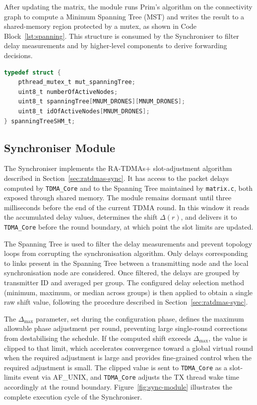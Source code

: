 After updating the matrix, the module runs Prim's algorithm on the connectivity graph to compute
a Minimum Spanning Tree (MST) and writes the result to a shared-memory region protected by
a mutex, as shown in Code Block~\ref{lst:spanning}. This structure is consumed by the Synchroniser
to filter delay measurements and by higher-level components to derive forwarding decisions.

\medskip
\noindent\begin{minipage}{\linewidth}
\begin{lstlisting}[language=C,
    caption={Variables stored in the shared memory for the Spanning Tree~\cite{almeida2023synchronization}},
    label={lst:spanning}]
typedef struct {
    pthread_mutex_t mut_spanningTree;
    uint8_t numberOfActiveNodes;
    uint8_t spanningTree[MNUM_DRONES][MNUM_DRONES];
    uint8_t idOfActiveNodes[MNUM_DRONES];
} spanningTreeSHM_t;
\end{lstlisting}
\end{minipage}

\subsection{Synchroniser Module}

The Synchroniser implements the RA-TDMAs+ slot-adjustment algorithm described in
Section~\ref{sec:ratdmas-sync}. It has access to the packet delays computed by
\texttt{TDMA\_Core} and to the Spanning Tree maintained by \texttt{matrix.c}, both exposed
through shared memory. The module remains dormant until three milliseconds before the end of
the current TDMA round. In this window it reads the accumulated delay values, determines the
shift $\Delta(r)$, and delivers it to \texttt{TDMA\_Core} before the round boundary, at which
point the slot limits are updated.

The Spanning Tree is used to filter the delay measurements and prevent topology loops from
corrupting the synchronisation algorithm. Only delays corresponding to links present in the
Spanning Tree between a transmitting node and the local synchronisation node are considered.
Once filtered, the delays are grouped by transmitter ID and averaged per group. The configured
delay selection method (minimum, maximum, or median across groups) is then applied to obtain
a single raw shift value, following the procedure described in Section~\ref{sec:ratdmas-sync}.

The $\Delta_{\max}$ parameter, set during the configuration phase, defines the maximum
allowable phase adjustment per round, preventing large single-round corrections from
destabilising the schedule. If the computed shift exceeds $\Delta_{\max}$, the value is clipped
to that limit, which accelerates convergence toward a global virtual round when the required
adjustment is large and provides fine-grained control when the required adjustment is small.
The clipped value is sent to \texttt{TDMA\_Core} as a slot-limits event via AF\_UNIX, and
\texttt{TDMA\_Core} adjusts the TX thread wake time accordingly at the round boundary.
Figure~\ref{fig:sync-module} illustrates the complete execution cycle of the Synchroniser.

